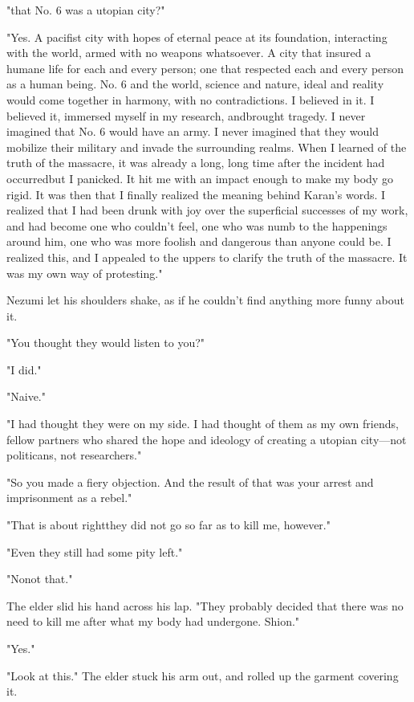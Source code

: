 "\el that No. 6 was a utopian city?"

"Yes. A pacifist city with hopes of eternal peace at its foundation,
interacting with the world, armed with no weapons whatsoever. A city
that insured a humane life for each and every person; one that respected
each and every person as a human being. No. 6 and the world, science and
nature, ideal and reality would come together in harmony, with no
contradictions. I believed in it. I believed it, immersed myself in my
research, and\el brought tragedy. I never imagined that No. 6 would have
an army. I never imagined that they would mobilize their military and
invade the surrounding realms. When I learned of the truth of the
massacre, it was already a long, long time after the incident had
occurred\el but I panicked. It hit me with an impact enough to make my
body go rigid. It was then that I finally realized the meaning behind
Karan's words. I realized that I had been drunk with joy over the
superficial successes of my work, and had become one who couldn't feel,
one who was numb to the happenings around him, one who was more foolish
and dangerous than anyone could be. I realized this, and I appealed to
the uppers to clarify the truth of the massacre. It was my own way of
protesting."

Nezumi let his shoulders shake, as if he couldn't find anything more
funny about it.

"You thought they would listen to you?"

"I did."

"Naive."

"I had thought they were on my side. I had thought of them as my own
friends, fellow partners who shared the hope and ideology of creating a
utopian city---not politicans, not researchers."

"So you made a fiery objection. And the result of that was your arrest
and imprisonment as a rebel."

"That is about right\el they did not go so far as to kill me, however."

"Even they still had some pity left."

"No\el not that."

The elder slid his hand across his lap. "They probably decided that
there was no need to kill me after what my body had undergone. Shion."

"Yes."

"Look at this." The elder stuck his arm out, and rolled up the garment
covering it.

